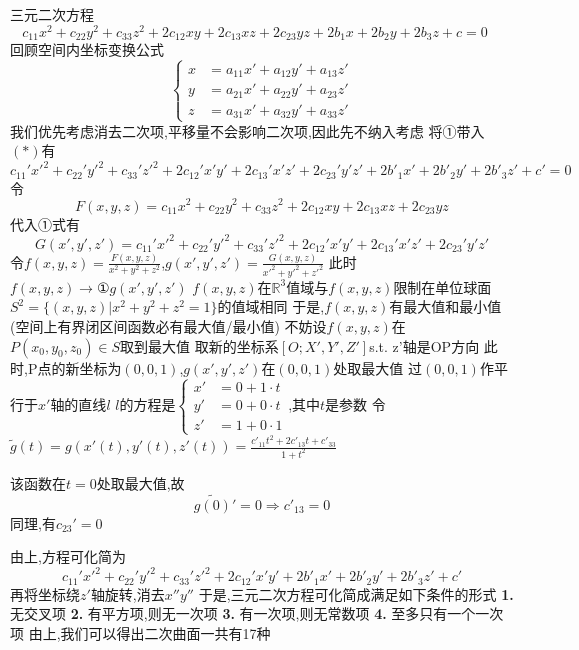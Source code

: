 \documentclass[UTF8,11pt]{ctexart}
\theoremstyle{cnthm}
\begin{document}
三元二次方程
\[
c_{11}x^2+c_{22}y^2+c_{33}z^2+2c_{12}xy+2c_{13}xz+2c_{23}yz+2b_1x+2b_2y+2b_3z+c = 0 \quad \tag{*}
\]
回顾空间内坐标变换公式
\[
\left \{ \begin{aligned}
x &= a_{11}x' + a_{12}y' + a_{13}z' \\
y &= a_{21}x' + a_{22}y' + a_{23}z' \\
z &= a_{31}x' + a_{32}y' + a_{33}z'
\end{aligned} \right.
\]
我们优先考虑消去二次项,平移量不会影响二次项,因此先不纳入考虑
将①带入$( * )$有
\[
c_{11}'x'^2+c_{22}'y'^2+c_{33}'z'^2+2c_{12}'x'y'+2c_{13}'x'z'+2c_{23}'y'z'+2b'_1x'+2b'_2y'+2b'_3z'+c'=0
\]
令
\[
F(x,y,z) = c_{11}x^2+c_{22}y^2+c_{33}z^2+2c_{12}xy+2c_{13}xz+2c_{23}yz
\]
代入①式有
\[
G(x',y',z') = c_{11}'x'^2+c_{22}'y'^2+c_{33}'z'^2+2c_{12}'x'y'+2c_{13}'x'z'+2c_{23}'y'z'
\]
令$f(x,y,z) = \frac{F(x,y,z)}{x^2+y^2+z^2}$,$g(x',y',z') = \frac{G(x,y,z)}{x'^2+y'^2+z'^2}$
此时$f(x,y,z) \rightarrow\text{①} g(x',y',z')$	
$f(x,y,z)$在$\mathbb{R}^3$值域与$f(x,y,z)$限制在单位球面$S^2 = \{ (x,y,z)|x^2+y^2+z^2=1 \}$的值域相同
于是,$f(x,y,z)$有最大值和最小值(空间上有界闭区间函数必有最大值/最小值)
不妨设$f(x,y,z)$在$P(x_0,y_0,z_0)\in S$取到最大值
取新的坐标系$[O;X',Y',Z']$s.t. z'轴是OP方向
此时,P点的新坐标为$(0,0,1)$,$g(x',y',z')$在$(0,0,1)$处取最大值
过$(0,0,1)$作平行于$x'$轴的直线$l$
$l$的方程是$\left \{ \begin{aligned} x' &= 0 +1 \cdot t \\ y' &= 0 + 0 \cdot t \\z' &= 1 + 0 \cdot 1 \end{aligned} \right.$,其中$t$是参数
令$\widetilde{g}(t) = g(x'(t),y'(t),z'(t))=\frac{c'_{11}t^2+2c'_{13}t+c'_{33}}{1+t^2}$

该函数在$t=0$处取最大值,故
\[
\tilde{g(0)}' = 0 \Rightarrow c'_{13} = 0
\]
同理,有$c_{23}' = 0$

由上,方程可化简为
\[
c_{11}'x'^2+c_{22}'y'^2+c_{33}'z'^2+2c_{12}'x'y'+2b'_{1}x'+2b'_{2}y'+2b'_{3}z'+c'
\]
再将坐标绕$z'$轴旋转,消去$x''y''$
于是,三元二次方程可化简成满足如下条件的形式
\noindent\textbf{1.} 无交叉项
\noindent\textbf{2.} 有平方项,则无一次项
\noindent\textbf{3.} 有一次项,则无常数项
\noindent\textbf{4.} 至多只有一个一次项
由上,我们可以得出二次曲面一共有17种
\end{document}
